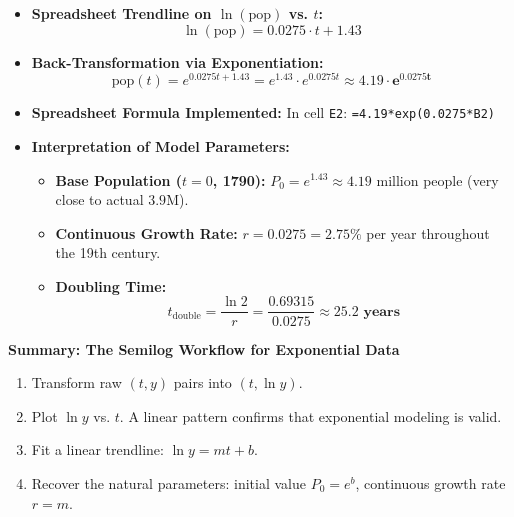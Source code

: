 \documentclass[10.5pt]{article}
\begin{document}
\begin{itemize}[leftmargin=1.2em, topsep=1pt, itemsep=2pt]
  \item \textbf{Spreadsheet Trendline on $\ln(\text{pop})$ vs. $t$:}
  \[
    \ln(\text{pop}) = 0.0275 \cdot t + 1.43
  \]
  \item \textbf{Back-Transformation via Exponentiation:}
  \[
    \text{pop}(t) = e^{0.0275 t + 1.43} = e^{1.43} \cdot e^{0.0275 t} \approx \mathbf{4.19 \cdot e^{0.0275 t}}
  \]
  \item \textbf{Spreadsheet Formula Implemented:}
  In cell \texttt{E2}: \quad \texttt{=4.19*exp(0.0275*B2)}
  \item \textbf{Interpretation of Model Parameters:}
  \begin{itemize}[label=--]
    \item \textbf{Base Population ($t=0$, 1790):} $P_0 = e^{1.43} \approx 4.19$ million people (very close to actual $3.9$M).
    \item \textbf{Continuous Growth Rate:} $r = 0.0275 = 2.75\%$ per year throughout the 19th century.
    \item \textbf{Doubling Time:}
    \[
      t_{\text{double}} = \frac{\ln 2}{r} = \frac{0.69315}{0.0275} \approx \mathbf{25.2 \text{ years}}
    \]
  \end{itemize}
\end{itemize}

\begin{tcolorbox}[colback=chalkblue!6, colframe=chalkblue, boxrule=1pt, arc=3pt, left=8pt, right=8pt, top=5pt, bottom=5pt]
\textbf{\large Summary: The Semilog Workflow for Exponential Data}
\begin{enumerate}[leftmargin=1.4em, topsep=1pt, itemsep=1pt]
  \item Transform raw $(t, y)$ pairs into $(t, \ln y)$.
  \item Plot $\ln y$ vs. $t$. A linear pattern confirms that exponential modeling is valid.
  \item Fit a linear trendline: $\ln y = m t + b$.
  \item Recover the natural parameters: initial value $P_0 = e^b$, continuous growth rate $r = m$.
\end{enumerate}
\end{tcolorbox}
\end{document}
